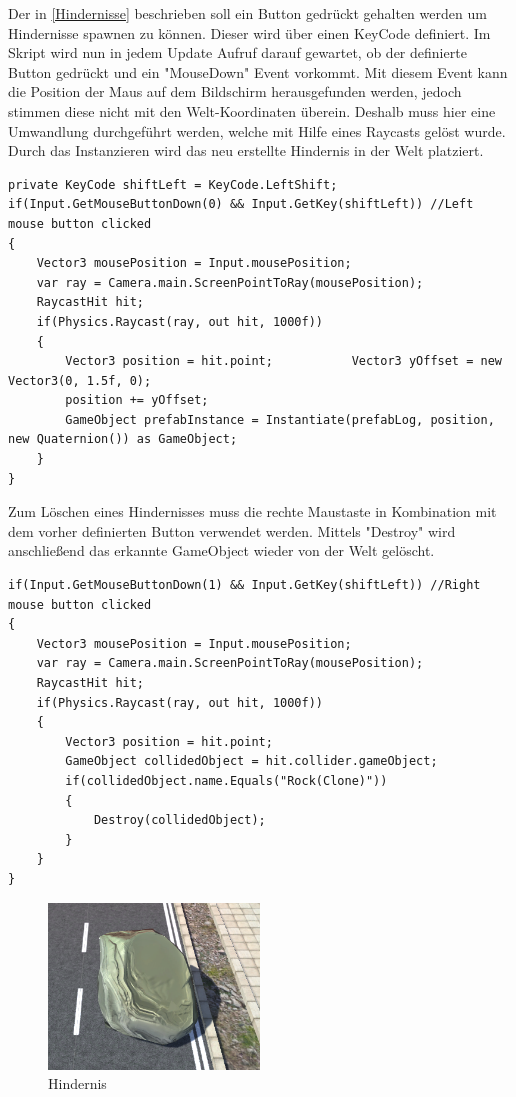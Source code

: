 Der in \ref{Hindernisse} beschrieben soll ein Button gedrückt gehalten werden um Hindernisse spawnen zu können. Dieser wird über einen KeyCode definiert. Im Skript wird nun in jedem Update Aufruf darauf gewartet, ob der definierte Button gedrückt und ein "MouseDown" Event vorkommt. Mit diesem Event kann die Position der Maus auf dem Bildschirm herausgefunden werden, jedoch stimmen diese nicht mit den Welt-Koordinaten überein. Deshalb muss hier eine Umwandlung durchgeführt werden, welche mit Hilfe eines Raycasts gelöst wurde. Durch das Instanzieren wird das neu erstellte Hindernis in der Welt platziert.

\begin{lstlisting}[caption={Erstellen des Hindernisses},label={lst:Hinderniss_erstellen}]
private KeyCode shiftLeft = KeyCode.LeftShift;
if(Input.GetMouseButtonDown(0) && Input.GetKey(shiftLeft)) //Left mouse button clicked
{
	Vector3 mousePosition = Input.mousePosition;
	var ray = Camera.main.ScreenPointToRay(mousePosition);
	RaycastHit hit;
	if(Physics.Raycast(ray, out hit, 1000f))
	{
		Vector3 position = hit.point;			Vector3 yOffset = new Vector3(0, 1.5f, 0);
		position += yOffset;			
		GameObject prefabInstance = Instantiate(prefabLog, position, new Quaternion()) as GameObject;
	}
}
\end{lstlisting}

Zum Löschen eines Hindernisses muss die rechte Maustaste in Kombination mit dem vorher definierten Button verwendet werden. Mittels "Destroy" wird anschließend das erkannte GameObject wieder von der Welt gelöscht.

\begin{lstlisting}[caption={Zerstören des Hindernisses},label={lst:Hinderniss_zerstören}]
if(Input.GetMouseButtonDown(1) && Input.GetKey(shiftLeft)) //Right mouse button clicked
{
	Vector3 mousePosition = Input.mousePosition;
	var ray = Camera.main.ScreenPointToRay(mousePosition);
	RaycastHit hit;
	if(Physics.Raycast(ray, out hit, 1000f))
	{
		Vector3 position = hit.point;
		GameObject collidedObject = hit.collider.gameObject;
		if(collidedObject.name.Equals("Rock(Clone)"))
		{
			Destroy(collidedObject);
		}
	}
}
\end{lstlisting}

\begin{figure}[H]
\begin{center}
\includegraphics[width=0.5\textwidth]{BilderAllgemein/rock.PNG}
\end{center}
	\caption{Hindernis}
	\label{img:hindernis}
\end{figure}

